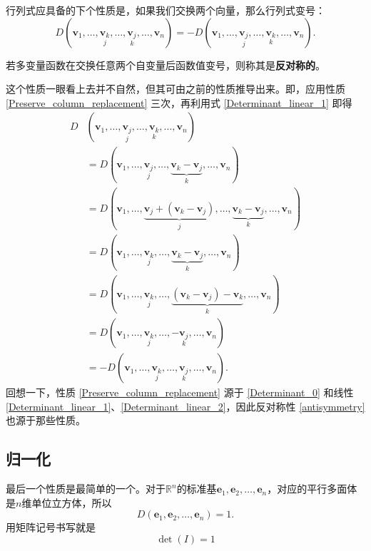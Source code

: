 行列式应具备的下个性质是，如果我们交换两个向量，那么行列式变号：
\begin{equation}\label{antisymmetry}
  D(\mathbf{v}_1,\ldots,\underset{j}{\mathbf{v}_k},\ldots,\underset{k}{\mathbf{v}_j},\ldots,\mathbf{v}_n)=-D(\mathbf{v}_1,\ldots,\underset{j}{\mathbf{v}_j},\ldots,\underset{k}{\mathbf{v}_k},\ldots,\mathbf{v}_n).
\end{equation}
\begin{remark*}
  若多变量函数在交换任意两个自变量后函数值变号，则称其是{\bf 反对称的}。
\end{remark*}
这个性质一眼看上去并不自然，但其可由之前的性质推导出来。即，应用性质 \eqref{Preserve_column_replacement} 三次，再利用式 \eqref{Determinant_linear_1} 即得
\begin{align*}
  D&(\mathbf{v}_{1},\ldots,\underset{j}{\mathbf{v}_j},\ldots,\underset{k}{\mathbf{v}_k},\ldots,\mathbf{v}_{n})\\
  &=D(\mathbf{v}_{1},\ldots,\underset{j}{\mathbf{v}_j},\ldots,\underbrace{\mathbf{v}_{k}-\mathbf{v}_{j}}_{k},\ldots,\mathbf{v}_{n})\\
  &=D(\mathbf{v}_{1},\ldots,\underbrace{\mathbf{v}_{j}+(\mathbf{v}_{k}-\mathbf{v}_{j})}_{j},\ldots,\underbrace{\mathbf{v}_{k}-\mathbf{v}_{j}}_{k},\ldots,\mathbf{v}_{n})\\
  &=D(\mathbf{v}_{1},\ldots,\underset{j}{\mathbf{v}_k},\ldots,\underbrace{\mathbf{v}_{k}-\mathbf{v}_{j}}_{k},\ldots,\mathbf{v}_{n})\\
  &=D(\mathbf{v}_{1},\ldots,\underset{j}{\mathbf{v}_k},\ldots,\underbrace{(\mathbf{v}_{k}-\mathbf{v}_{j})-\mathbf{v}_{k}}_{k},\ldots,\mathbf{v}_{n})\\
  &=D(\mathbf{v}_1,\ldots,\underset{j}{\mathbf{v}_k},\ldots,-\underset{k}{\mathbf{v}_j},\ldots,\mathbf{v}_n)\\
  &=-D(\mathbf{v}_{1},\ldots,\underset{j}{\mathbf{v}_k},\ldots,\underset{k}{\mathbf{v}_j},\ldots,\mathbf{v}_{n}).
\end{align*}
回想一下，性质 \eqref{Preserve_column_replacement} 源于 \eqref{Determinant_0} 和线性 \eqref{Determinant_linear_1}、\eqref{Determinant_linear_2}，因此反对称性 \eqref{antisymmetry} 也源于那些性质。

\subsection{归一化}

最后一个性质是最简单的一个。对于$\mathbb{R}^n$的标准基$\mathbf{e}_1,\mathbf{e}_2,\ldots,\mathbf{e}_n$，对应的平行多面体是$n$维单位立方体，所以
\begin{equation}\label{normalization}
  D(\mathbf{e}_1,\mathbf{e}_2,\ldots,\mathbf{e}_n)=1.
\end{equation}
用矩阵记号书写就是\[\det(I)=1\]

